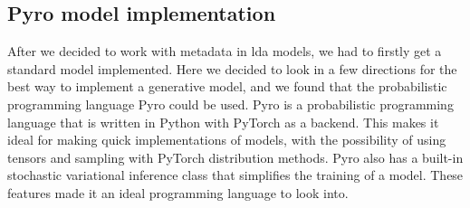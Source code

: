 \subsection{Pyro model implementation}
After we decided to work with metadata in \gls{lda} models, we had to firstly get a standard model implemented.
Here we decided to look in a few directions for the best way to implement a generative model, and we found that the probabilistic programming language Pyro could be used.
Pyro is a probabilistic programming language that is written in Python with PyTorch as a backend.
This makes it ideal for making quick implementations of models, with the possibility of using tensors and sampling with PyTorch distribution methods.
Pyro also has a built-in stochastic variational inference class that simplifies the training of a model.
These features made it an ideal programming language to look into.

